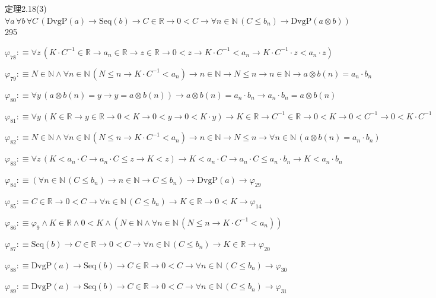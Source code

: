 \begin{fullproof}{定理2.18(3)}{$\forall a\,\forall b\,\forall C\,(\mathrm{DvgP}(a) \to \mathrm{Seq}(b) \to C \in \mathbb{R} \to 0 < C \to \forall n \in \mathbb{N}\,(C \leq b_{n}) \to \mathrm{DvgP}(a \otimes b))$}{295}
\begin{abbrevlist}
\item $\varphi_{78} :\equiv \forall z\,(K \cdot C^{-1} \in \mathbb{R} \to a_{n} \in \mathbb{R} \to z \in \mathbb{R} \to 0 < z \to K \cdot C^{-1} < a_{n} \to K \cdot C^{-1} \cdot z < a_{n} \cdot z)$
\item $\varphi_{79} :\equiv N \in \mathbb{N} \land \forall n \in \mathbb{N}\,(N \leq n \to K \cdot C^{-1} < a_{n}) \to n \in \mathbb{N} \to N \leq n \to n \in \mathbb{N} \to a \otimes b(n) = a_{n} \cdot b_{n}$
\item $\varphi_{80} :\equiv \forall y\,(a \otimes b(n) = y \to y = a \otimes b(n)) \to a \otimes b(n) = a_{n} \cdot b_{n} \to a_{n} \cdot b_{n} = a \otimes b(n)$
\item $\varphi_{81} :\equiv \forall y\,(K \in \mathbb{R} \to y \in \mathbb{R} \to 0 < K \to 0 < y \to 0 < K \cdot y) \to K \in \mathbb{R} \to C^{-1} \in \mathbb{R} \to 0 < K \to 0 < C^{-1} \to 0 < K \cdot C^{-1}$
\item $\varphi_{82} :\equiv N \in \mathbb{N} \land \forall n \in \mathbb{N}\,(N \leq n \to K \cdot C^{-1} < a_{n}) \to n \in \mathbb{N} \to N \leq n \to \forall n \in \mathbb{N}\,(a \otimes b(n) = a_{n} \cdot b_{n})$
\item $\varphi_{83} :\equiv \forall z\,(K < a_{n} \cdot C \to a_{n} \cdot C \leq z \to K < z) \to K < a_{n} \cdot C \to a_{n} \cdot C \leq a_{n} \cdot b_{n} \to K < a_{n} \cdot b_{n}$
\item $\varphi_{84} :\equiv (\forall n \in \mathbb{N}\,(C \leq b_{n}) \to n \in \mathbb{N} \to C \leq b_{n}) \to \mathrm{DvgP}(a) \to \varphi_{29}$
\item $\varphi_{85} :\equiv C \in \mathbb{R} \to 0 < C \to \forall n \in \mathbb{N}\,(C \leq b_{n}) \to K \in \mathbb{R} \to 0 < K \to \varphi_{14}$
\item $\varphi_{86} :\equiv \varphi_{9} \land K \in \mathbb{R} \land 0 < K \land (N \in \mathbb{N} \land \forall n \in \mathbb{N}\,(N \leq n \to K \cdot C^{-1} < a_{n}))$
\item $\varphi_{87} :\equiv \mathrm{Seq}(b) \to C \in \mathbb{R} \to 0 < C \to \forall n \in \mathbb{N}\,(C \leq b_{n}) \to K \in \mathbb{R} \to \varphi_{20}$
\item $\varphi_{88} :\equiv \mathrm{DvgP}(a) \to \mathrm{Seq}(b) \to C \in \mathbb{R} \to 0 < C \to \forall n \in \mathbb{N}\,(C \leq b_{n}) \to \varphi_{30}$
\item $\varphi_{89} :\equiv \mathrm{DvgP}(a) \to \mathrm{Seq}(b) \to C \in \mathbb{R} \to 0 < C \to \forall n \in \mathbb{N}\,(C \leq b_{n}) \to \varphi_{31}$

\end{abbrevlist}
\end{fullproof}
